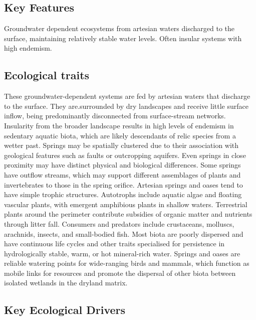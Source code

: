 \documentclass[
  letterpaper,
  DIV=11,
  numbers=noendperiod]{scrartcl}
\begin{document}
\subsection{Key Features}\label{key-features-15}

Groundwater dependent ecosystems from artesian waters discharged to the
surface, maintaining relatively stable water levels. Often insular
systems with high endemism.

\subsection{Ecological traits}\label{ecological-traits-15}

These groundwater-dependent systems are fed by artesian waters that
discharge to the surface. They are.surrounded by dry landscapes and
receive little surface inflow, being predominantly disconnected from
surface-stream networks. Insularity from the broader landscape results
in high levels of endemism in sedentary aquatic biota, which are likely
descendants of relic species from a wetter past. Springs may be
spatially clustered due to their association with geological features
such as faults or outcropping aquifers. Even springs in close proximity
may have distinct physical and biological differences. Some springs have
outflow streams, which may support different assemblages of plants and
invertebrates to those in the spring orifice. Artesian springs and oases
tend to have simple trophic structures. Autotrophs include aquatic algae
and floating vascular plants, with emergent amphibious plants in shallow
waters. Terrestrial plants around the perimeter contribute subsidies of
organic matter and nutrients through litter fall. Consumers and
predators include crustaceans, molluscs, arachnids, insects, and
small-bodied fish. Most biota are poorly dispersed and have continuous
life cycles and other traits specialised for persistence in
hydrologically stable, warm, or hot mineral-rich water. Springs and
oases are reliable watering points for wide-ranging birds and mammals,
which function as mobile links for resources and promote the dispersal
of other biota between isolated wetlands in the dryland matrix.

\subsection{Key Ecological Drivers}\label{key-ecological-drivers-15}
\end{document}
